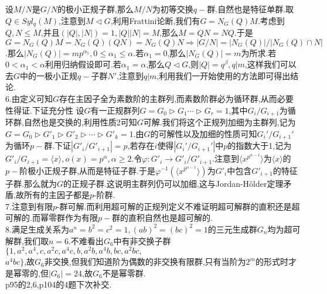 \documentclass[b5paper,twoside]{ctexart}
\begin{document}
设$M/N$是$G/N$的极小正规子群,那么$M/N$为初等交换$q-$群.自然也是特征单群.取$Q\in Syl_q(M)$,注意到$M\lhd G$,利用Frattini论断,我们有$G=N_G(Q)M$.考虑到$Q,N\leq M$,并且$(|Q|,|N|)=1,|Q||N|=M$,那么$M=QN=NQ$.于是$G=N_G(Q)M=N_G(Q)(QN)=N_G(Q)N\Rightarrow |G/N|=|N_G(Q)|/|N_G(Q)\cap N|$.那么$|N_G(Q)|=mp^{\alpha_1},0\leq \alpha_1\leq \alpha$.若$\alpha_1=0$,那么$|N_G(Q)|=m$为所求.若$0<\alpha_1< \alpha$利用归纳假设即可.若$\alpha_1=\alpha$,那么$Q\lhd G$,则$|Q|=q^{\beta},q|m$,这样我们可以去$G$中的一极小正规$q-$子群$N'$,注意到$q|m$,利用我们一开始使用的方法即可得出结论.\\
6.由定义可知$G$存在主因子全为素数阶的主群列,而素数阶群必为循环群,从而必要性得证.下证充分性
设$G$有一正规群列$G=G_0\rhd G_1\cdots \rhd G_r=1$,其中$G_i/G_{i+1}$为循环群,自然也是交换的,利用性质2可知$G$可解.我们将这个正规列加细为主群列,记为$G=G_0\rhd G'_1\rhd G'_2\rhd \cdots\rhd G'_k=1$.由$G$的可解性以及加细的性质可知$G_i'/G_{i+1}'$为循环$p-$群.下证$|G'_i/G'_{i+1}|=p$,若存在$i$使得$|G_i'/G_{i+1}'|$中$p$的指数大于1,记为$G'_i/G_{i+1}=\langle x\rangle,o(x)=p^{\alpha},\alpha\geq 2$.令$\varphi :G'_i\to G'_i/G'_{i+1}$.注意到$\langle x^{p^{\alpha-1}}\rangle$为$\langle x\rangle$的$p-$阶极小正规子群,从而是特征子群.于是$\varphi^{-1}(\langle x^{p^{\alpha-1}}\rangle)$为$G'_i$中包含$G'_{i+1}$的特征子群.那么就为$G$的正规子群.这说明主群列仍可以加细,这与Jordan-H\"{o}lder定理矛盾,故所有的主因子都是$p$-阶群.\\
7.注意到有限$p$-群可解.而利用超可解的正规列定义不难证明超可解群的直积还是超可解的.而幂零群作为有限$p-$群的直积自然也是超可解的.\\
8.满足生成关系为$a^n=b^2=c^2=1,(ab)^2=(bc)^2=1$的三元生成群$G_n$均为超可解群,我们取$n=6$.不难看出$G_6$中有非交换子群$\{1,a^2,a^4,c,a^2c,a^4c,b,a^2b,a^4b,bc,a^2bc,$\\
$a^4bc\}$,故$G_6$非交换,但我们知道阶为偶数的非交换有限群,只有当阶为$2^m$的形式时才是幂零的,但$|G_6|=24$,故$G_6$不是幂零群.\\
p95的2,6,p104的4题下次补交.\\
\end{document}
